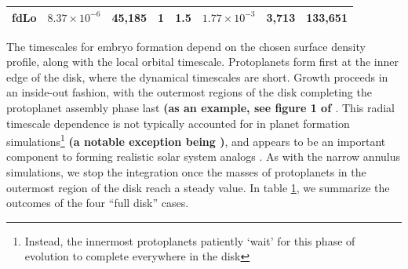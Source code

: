 \documentclass[twocolumn,linenumbers]{aastex63}
\begin{document}
\begin{table}
\begin{tabular}{lccccccc}
fdLo            & $8.37 \times 10^{-6}$                                                                                & 45,185                                                                                    & 1   & 1.5 & $1.77 \times 10^{-3}$                                                                              & 3,713                                                                               & 133,651                                  \\ \hline                                                   
\end{tabular}
\label{tab:sim_properties}
\end{table}

The timescales for embryo formation depend on
the chosen surface density profile, along with the local orbital
timescale. Protoplanets form first at the inner edge of the disk,
where the dynamical timescales are short. Growth proceeds in an
inside-out fashion, with the outermost regions of the disk completing
the protoplanet assembly phase last \textbf{(as an example, see figure 1 of \citet{kokubo02)}}. This radial timescale dependence is not typically
accounted for in planet formation simulations\footnote{Instead, the innermost protoplanets 
patiently `wait' for this phase of evolution to complete everywhere in the disk} \textbf{(a notable exception being \citet{emsenhuber21a, emsenhuber21b})}, and appears to be an
important component to forming realistic solar system analogs
\citep{clement20}. As with the narrow annulus simulations, we stop the
integration once the masses of protoplanets in the outermost region of
the disk reach a steady value. In table \ref{tab:sim_properties}, we
summarize the outcomes of the four ``full disk'' cases.
\end{document}

